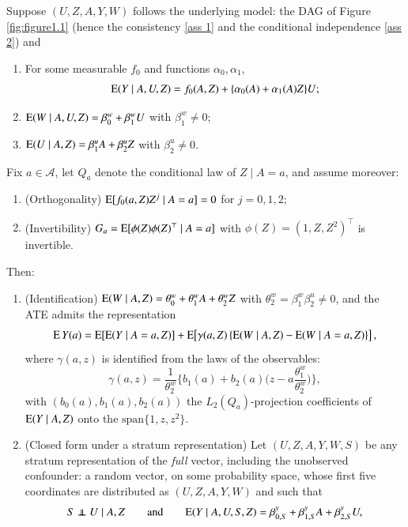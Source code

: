 \begin{theorem}[Extension 2]\label{thm: extension 2}\label{lemma: identify EYa from data}\label{prop: underlying}\label{prop: equivalence ATE}
Suppose $(U,Z,A,Y,W)$ follows the underlying model: the DAG of Figure \ref{fig:figure1.1} (hence the consistency \ref{ass 1} and the conditional independence \ref{ass 2}) and
\begin{enumerate}
\item For some measurable $f_0$ and functions $\alpha_0,\alpha_1$,
\[
\mathrm{E}(Y\mid A,U,Z)= f_0(A,Z) + \{\alpha_0(A)+\alpha_1(A)Z\}U;
\]
\item $\mathrm{E}(W\mid A,U,Z)=\beta_0^w+\beta_1^w U$ with $\beta_1^w\neq 0$;
\item $\mathrm{E}(U\mid A,Z)=\beta_1^u A+\beta_2^u Z$ with $\beta_2^u\neq 0$.
\end{enumerate}
Fix $a \in \mathcal{A}$, let $Q_a$ denote the conditional law of $Z\mid A=a$, and assume moreover:
\begin{enumerate}
\item[(i)] (Orthogonality) $\mathrm{E}[f_0(a,Z)Z^j\mid A=a]=0$ for $j=0,1,2$;
\item[(ii)] (Invertibility) $G_a=\mathrm{E}[\phi(Z)\phi(Z)^\top\mid A=a]$ with $\phi(Z)=(1,Z,Z^2)^\top$ is invertible.
\end{enumerate}
Then:
\begin{enumerate}[label=\textup{(\alph*)}]
\item (Identification) $\mathrm{E}(W\mid A,Z)=\theta_0^w+\theta_1^wA+\theta_2^wZ$ with $\theta_2^w = \beta_1^w\beta_2^u \neq 0$, and the ATE admits the representation
\begin{align}\label{eq: ATE underlying ext2}
\mathrm{E} \, Y(a)
=
\mathrm{E}[\mathrm{E}(Y\mid A=a,Z)]
+
\mathrm{E}\!\left[
\gamma(a,Z)\,
\{\mathrm{E}(W\mid A,Z)-\mathrm{E}(W\mid A=a,Z)\}
\right],
\end{align}
where $\gamma(a,z)$ is identified from the laws of the observables:
\[
\gamma(a,z)=\frac{1}{\theta_2^w}\Big\{ b_1(a)+b_2(a)\Big(z-a\frac{\theta_1^w}{\theta_2^w}\Big)\Big\},
\]
with $(b_0(a),b_1(a),b_2(a))$ the $L_2(Q_a)$-projection coefficients of $\mathrm{E}(Y\mid A,Z)$ onto the $\mathrm{span}\{1,z,z^2\}$.
\item (Closed form under a stratum representation) Let $(U,Z,A,Y,W,S)$ be any stratum representation of the \emph{full} vector, including the unobserved confounder: a random vector, on some probability space, whose first five coordinates are distributed as $(U,Z,A,Y,W)$ and such that
\begin{align}
        S \independent U \mid A,Z \qquad \text{and} \qquad \ex(Y \mid A,U,S,Z) = \beta_{0,S}^{y} + \beta_{1,S}^{y} A + \beta_{2,S}^{y} U, \label{eq: stratum structure ext2}

\end{align}
\end{enumerate}
\end{theorem}
